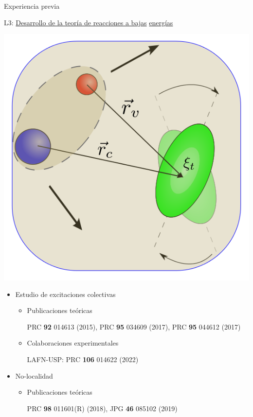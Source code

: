 \documentclass{beamer}
\begin{document}
\begin{frame}{Experiencia previa} 

   \begin{minipage}{0.45\textwidth}
    \tiny{}   L3: \underline{Desarrollo de la teoría de reacciones a bajas}  \underline{ energías}   
    
    \includegraphics[height=0.3\textheight, width=\textwidth, keepaspectratio]{TExc.png}
    \end{minipage}
    \begin{minipage}{0.45\textwidth}
    \tiny
    \begin{itemize}
    \item Estudio de excitaciones colectivas
    \begin{itemize}
       \tiny
    \item Publicaciones teóricas
    
    PRC \textbf{92} 014613 (2015), PRC \textbf{95} 034609 (2017), PRC \textbf{95} 044612 (2017)
    
    \item Colaboraciones experimentales
    
    LAFN-USP: PRC \textbf{106} 014622 (2022)
    
    \end{itemize}
    \item No-localidad
    \begin{itemize}
    \tiny
    \item Publicaciones teóricas
    
    PRC \textbf{98} 011601(R) (2018),  JPG \textbf{46} 085102 (2019)
    
    \end{itemize}
    \end{itemize}
    \end{minipage}
    
\end{frame}
\end{document}

